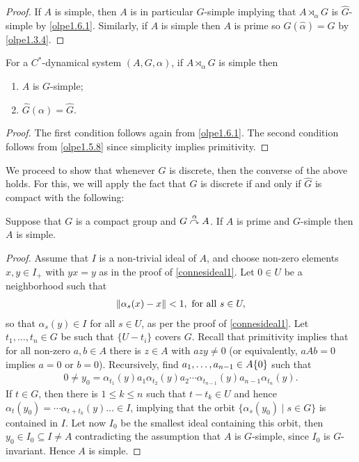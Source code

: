 \begin{proof}
	If $A$ is simple, then $A$ is in particular $G$-simple implying that $A \rtimes_\alpha G$ is $\hat G$-simple by \cref{olpe1.6.1}. Similarly, if $A$ is simple then $A$ is prime so $G(\hat \alpha) = G$ by \cref{olpe1.3.4}.
\end{proof}
\begin{proposition}
	For a $C^*$-dynamical system $(A,G,\alpha)$, if $A \rtimes_\alpha G$ is simple then 
	\begin{enumerate}
		\item $A$ is $G$-simple;
		\item $\hat G(\alpha)= \hat G$.
	\end{enumerate}
	\label{olpe1.6.3}
\end{proposition}
\begin{proof}
	The first condition follows again from \cref{olpe1.6.1}. The second condition follows from \cref{olpe1.5.8} since simplicity implies primitivity.
\end{proof}
We proceed to show that whenever $G$ is discrete, then the converse of the above holds. For this, we will apply the fact that $G$ is discrete if and only if $\hat G$ is compact with the following:
\begin{lemma}
	Suppose that $G$ is a compact group and $G \stackrel{\alpha}{\curvearrowright} A$. If $A$ is prime and $G$-simple then $A$ is simple.	
	\label{olpe1.6.4}
\end{lemma}
\begin{proof}
	Assume that $I$ is a non-trivial ideal of $A$, and choose non-zero elements $x,y \in I_+$ with $yx=y$ as in the proof of \cref{connesideal1}. Let $0 \in U$ be a neighborhood such that 
	\begin{align*}
		\left\lVert \alpha_s(x)-x\right\rVert < 1, \text{ for all }s \in U,
	\end{align*}
	so that $\alpha_s(y) \in I$ for all $s \in U$, as per the proof of \cref{connesideal1}. Let $t_1,\dots,t_n \in G$ be such that $\{ U - t_i\}$ covers $G$. Recall that primitivity implies that for all non-zero $a,b \in A$ there is $z \in A$ with $azy \neq 0$ (or equivalently, $aAb = 0 $ implies $a=0$ or $b = 0$). Recursively, find $a_1,\dots,a_{n-1} \in A \\ \{0\}$ such that
	\begin{align*}
	0 \neq	y_0 = \alpha_{t_1}(y) a_1 \alpha_{t_2}(y) a_2\cdots \alpha_{t_{n-1}}(y) a_{n-1} \alpha_{t_n}(y).
	\end{align*}
	If $t \in G$, then there is $1 \leq k \leq n$ such that $t-t_k \in U$ and hence $\alpha_t(y_0) = \cdots \alpha_{t+t_k}(y) \dots \in I$, implying that the orbit $\{\alpha_s(y_0) \mid s \in G\}$ is contained in $I$. Let now $I_0$ be the smallest ideal containing this orbit, then $y_0 \in I_0 \subseteq I \neq A$ contradicting the assumption that $A$ is $G$-simple, since $I_0$ is $G$-invariant. Hence $A$ is simple.
\end{proof}
